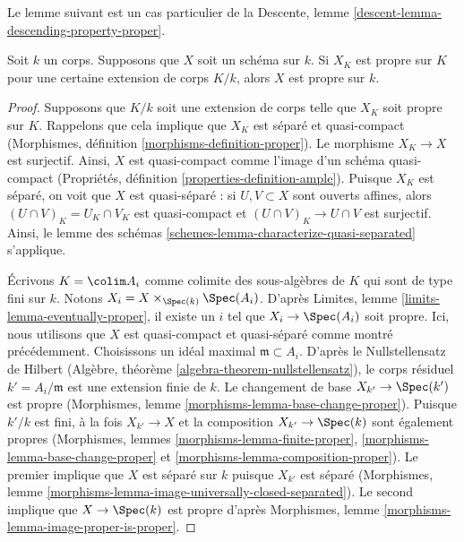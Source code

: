 \noindent
Le lemme suivant est un cas particulier de la Descente,
lemme \ref{descent-lemma-descending-property-proper}.

\begin{lemma}
\label{lemma-proper-after-field-extension}
Soit $k$ un corps. Supposons que $X$ soit un
schéma sur $k$. Si $X_K$ est propre sur $K$ pour une
certaine extension de corps $K/k$, alors $X$ est propre sur $k$.
\end{lemma}

\begin{proof}
Supposons que $K/k$ soit une extension de corps telle que $X_K$ soit
propre sur $K$. Rappelons que cela implique que $X_K$ est séparé et
quasi-compact (Morphismes, définition
\ref{morphisms-definition-proper}). Le morphisme $X_K \to X$ est
surjectif. Ainsi, $X$ est quasi-compact comme l'image d'un schéma
quasi-compact (Propriétés, définition \ref{properties-definition-ample}).
Puisque $X_K$ est séparé, on voit que $X$ est quasi-séparé : si $U, V
\subset X$ sont ouverts affines, alors $(U \cap V)_K = U_K \cap V_K$ est
quasi-compact et $(U \cap V)_K \to U \cap V$ est surjectif. Ainsi, le
lemme des schémas \ref{schemes-lemma-characterize-quasi-separated} s'applique.

\medskip\noindent
Écrivons $K = \colim A_i$ comme colimite des
sous-algèbres de $K$ qui sont de type fini sur $k$.
Notons $X_i = X \times_{\Spec(k)} \Spec(A_i)$. D'après
Limites, lemme \ref{limits-lemma-eventually-proper}, il
existe un $i$ tel que $X_i \to \Spec(A_i)$ soit propre.
Ici, nous utilisons que $X$ est quasi-compact et
quasi-séparé comme montré précédemment. Choisissons un
idéal maximal $\mathfrak m \subset A_i$. D'après le
Nullstellensatz de Hilbert (Algèbre, théorème
\ref{algebra-theorem-nullstellensatz}), le corps résiduel
$k' = A_i/\mathfrak m$ est une extension finie de $k$. Le
changement de base $X_{k'} \to \Spec(k')$ est propre
(Morphismes, lemme
\ref{morphisms-lemma-base-change-proper}). Puisque $k'/k$ est
fini, à la fois $X_{k'} \to X$ et la composition $X_{k'} \to
\Spec(k)$ sont également propres (Morphismes, lemmes
\ref{morphisms-lemma-finite-proper},
\ref{morphisms-lemma-base-change-proper} et
\ref{morphisms-lemma-composition-proper}). Le premier implique que $X$ est
séparé sur $k$ puisque $X_{k'}$ est séparé (Morphismes, lemme
\ref{morphisms-lemma-image-universally-closed-separated}). Le second implique que $X \to
\Spec(k)$ est propre d'après Morphismes, lemme \ref{morphisms-lemma-image-proper-is-proper}.
\end{proof}

